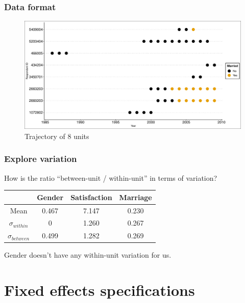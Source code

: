 \documentclass[10pt,english,dvipsnames,aspectratio=169,handout]{beamer}\usepackage[]{graphicx}\usepackage[]{xcolor}
\begin{document}
\begin{frame}
  \frametitle{Data format}




  
  \begin{figure}
  \caption{Trajectory of 8 units}
  \begin{center}
      \includegraphics[scale=0.35]{../04-figures/09/05.pdf}
  \end{center}
  \label{fig:01}
  \end{figure}
  
\end{frame}


\begin{frame}
  \frametitle{Explore variation}
  How is the ratio ``between-unit / within-unit'' in terms of variation?\bigskip
  
\begin{table}[!ht]
\centering
\begin{tabular}{c c c c}
\toprule
    & Gender & Satisfaction & Marriage \\
\midrule
Mean               & 0.467 & 7.147 & 0.230  \\
$\sigma_{within}$  & 0     & 1.260 & 0.267  \\
$\sigma_{between}$ & 0.499 & 1.282 & 0.269  \\  
\bottomrule
\end{tabular}
\label{tab:01}
\end{table}

  Gender doesn't have any within-unit variation for us.
  
\end{frame}


\section{Fixed effects specifications}
\end{document}
